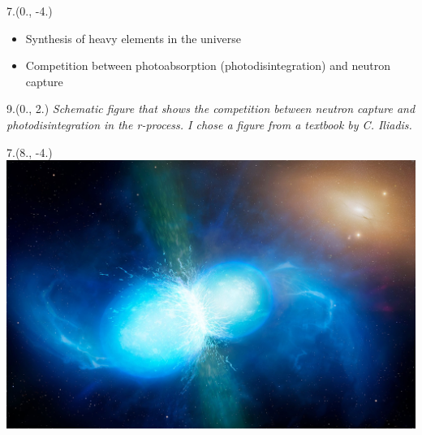 



\begin{textblock}{7.}(0., -4.)
    \begin{itemize}
        \item Synthesis of heavy elements in the universe
        \item Competition between photoabsorption (photodisintegration) and neutron capture
    \end{itemize}
\end{textblock}

\begin{textblock}{9.}(0., 2.)
    \textit{Schematic figure that shows the competition between neutron capture and photodisintegration in the r-process.
    I chose a figure from a textbook by C. Iliadis.}
\end{textblock}

\begin{textblock}{7.}(8., -4.)
    \includegraphics[width=\textwidth]{figures/neutron_star_merger.jpg}
\end{textblock}